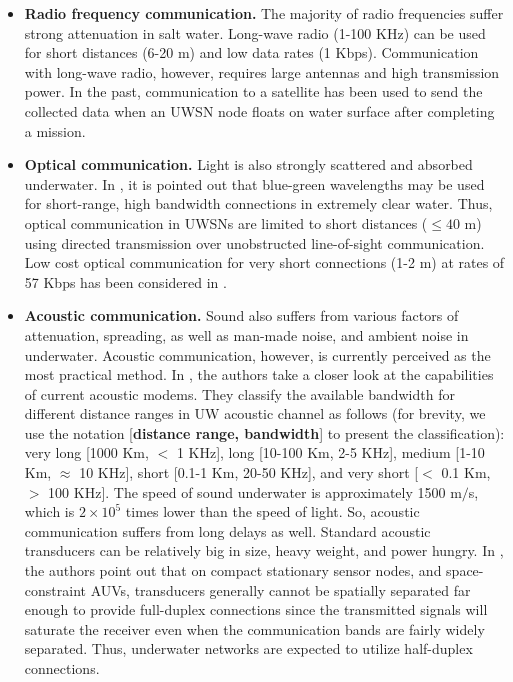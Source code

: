 \begin{itemize}
\item \textbf{Radio frequency communication.} The majority of radio frequencies suffer strong attenuation in salt water. Long-wave radio (1-100 KHz) can be used for short distances (6-20 m) and low data rates (1 Kbps). Communication with long-wave radio, however, requires large antennas and high transmission power.
In the past, communication to a satellite has been used to send the collected data when an UWSN node floats on water surface after completing a mission.

\item \textbf{Optical communication.} Light is also strongly scattered and absorbed underwater. In \cite{partan2007survey}, it is pointed out that blue-green wavelengths may be used for short-range, high bandwidth connections in extremely clear water.
Thus, optical communication in UWSNs are limited to short distances ($\leq 40$ m) using directed transmission over unobstructed line-of-sight communication.
Low cost optical communication for very short connections (1-2 m) at rates of 57 Kbps has been considered in \cite{fair2006optical, freitag2001acoustic}.

\item \textbf{Acoustic communication.} Sound also suffers from various factors of attenuation, spreading, as well as man-made noise, and ambient noise in underwater. 
Acoustic communication, however, is currently perceived as the most practical method.
In \cite{akyildiz2005underwater}, the authors take a closer look at the capabilities of current acoustic modems. 
They classify the available bandwidth for different distance ranges in UW acoustic channel as follows (for brevity, we use the notation [\textbf{distance range, bandwidth}] to present the classification):  very long [1000 Km, $<$ 1 KHz], long [10-100 Km, 2-5 KHz], medium [1-10 Km, $\approx$ 10 KHz], short [0.1-1 Km, 20-50 KHz], and very short [$<$ 0.1 Km, $>$ 100 KHz].
The speed of sound underwater is approximately 1500 m$/$s, which is $2\times 10^5$ times lower than the speed of light. 
So, acoustic communication suffers from long delays as well.
Standard acoustic transducers can be relatively big in size, heavy weight, and power hungry. In \cite{partan2007survey}, the authors point out that on compact stationary sensor nodes, and space-constraint AUVs, transducers generally cannot be spatially separated far enough to provide full-duplex connections since the transmitted signals will saturate the receiver even when the communication bands are fairly widely separated.
Thus, underwater networks are expected to utilize half-duplex connections.
\end{itemize}

